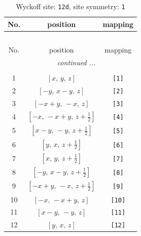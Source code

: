 \documentclass[fleqn,8pt]{jsarticle}
\begin{document}
\begin{longtable}{ccc}
\caption{Wyckoff site: {\tt 12d}, site symmetry: {\tt 1}}
 \\
 \hline \hline
No. & position & mapping \\ \hline \endfirsthead

\multicolumn{2}{l}{\tablename\ \thetable{}} \\
 \hline \hline
No. & position & mapping \\ \hline \endhead

 \hline \hline
\multicolumn{2}{r}{\footnotesize\it continued ...} \\ \endfoot

 \hline \hline
\multicolumn{2}{r}{} \\ \endlastfoot

1 & $\left[ x,\, y,\, z \right]$ & {\tt [1]} \\ \hline
2 & $\left[ - y,\, x - y,\, z \right]$ & {\tt [2]} \\ \hline
3 & $\left[ - x + y,\, - x,\, z \right]$ & {\tt [3]} \\ \hline
4 & $\left[ - x,\, - x + y,\, z + \frac{1}{2} \right]$ & {\tt [4]} \\ \hline
5 & $\left[ x - y,\, - y,\, z + \frac{1}{2} \right]$ & {\tt [5]} \\ \hline
6 & $\left[ y,\, x,\, z + \frac{1}{2} \right]$ & {\tt [6]} \\ \hline
7 & $\left[ x,\, y,\, z + \frac{1}{2} \right]$ & {\tt [7]} \\ \hline
8 & $\left[ - y,\, x - y,\, z + \frac{1}{2} \right]$ & {\tt [8]} \\ \hline
9 & $\left[ - x + y,\, - x,\, z + \frac{1}{2} \right]$ & {\tt [9]} \\ \hline
10 & $\left[ - x,\, - x + y,\, z \right]$ & {\tt [10]} \\ \hline
11 & $\left[ x - y,\, - y,\, z \right]$ & {\tt [11]} \\ \hline
12 & $\left[ y,\, x,\, z \right]$ & {\tt [12]} \\
\end{longtable}
\end{document}
